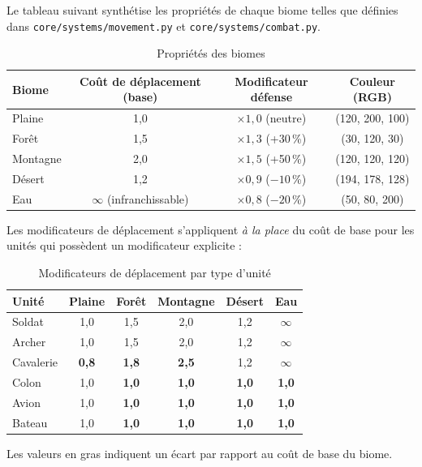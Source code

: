 \documentclass[12pt, a4paper]{article}
\begin{document}
Le tableau suivant synthétise les propriétés de chaque biome telles que définies dans
\texttt{core/systems/}\texttt{movement.py} et \texttt{core/systems/combat.py}.

\begin{table}[H]
\centering
\caption{Propriétés des biomes}
\label{tab:biomes}
\renewcommand{\arraystretch}{1.3}
\begin{tabular}{|l|c|c|c|}
\hline
\textbf{Biome} & \textbf{Coût de déplacement (base)} & \textbf{Modificateur défense} & \textbf{Couleur (RGB)} \\
\hline
Plaine   & 1,0  & $\times 1{,}0$ (neutre)    & (120, 200, 100) \\
Forêt    & 1,5  & $\times 1{,}3$ (+30\,\%)   & (30, 120, 30)   \\
Montagne & 2,0  & $\times 1{,}5$ (+50\,\%)   & (120, 120, 120) \\
Désert   & 1,2  & $\times 0{,}9$ ($-10$\,\%) & (194, 178, 128) \\
Eau      & $\infty$ (infranchissable) & $\times 0{,}8$ ($-20$\,\%) & (50, 80, 200) \\
\hline
\end{tabular}
\end{table}

Les modificateurs de déplacement s'appliquent \emph{à la place} du coût de base pour
les unités qui possèdent un modificateur explicite :

\begin{table}[H]
\centering
\caption{Modificateurs de déplacement par type d'unité}
\label{tab:movement_modifiers}
\renewcommand{\arraystretch}{1.3}
\begin{tabular}{|l|c|c|c|c|c|}
\hline
\textbf{Unité} & \textbf{Plaine} & \textbf{Forêt} & \textbf{Montagne} & \textbf{Désert} & \textbf{Eau} \\
\hline
Soldat   & 1,0 & 1,5 & 2,0       & 1,2 & $\infty$ \\
Archer   & 1,0 & 1,5 & 2,0       & 1,2 & $\infty$ \\
Cavalerie & \textbf{0,8} & \textbf{1,8} & \textbf{2,5} & 1,2 & $\infty$ \\
Colon    & 1,0 & \textbf{1,0} & \textbf{1,0} & \textbf{1,0} & \textbf{1,0} \\
Avion    & 1,0 & \textbf{1,0} & \textbf{1,0} & \textbf{1,0} & \textbf{1,0} \\
Bateau   & 1,0 & \textbf{1,0} & \textbf{1,0} & \textbf{1,0} & \textbf{1,0} \\
\hline
\end{tabular}
\end{table}
\noindent Les valeurs en gras indiquent un écart par rapport au coût de base du biome.
\end{document}
